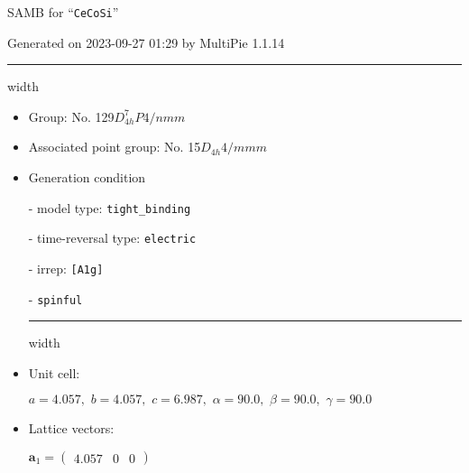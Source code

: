 \documentclass[fleqn,10pt,landscape]{article}
\begin{document}
\setcounter{MaxMatrixCols}{16}

\setlength{\baselineskip}{16pt}
\footnotesize
\begin{center}
\LARGE
SAMB for ``\texttt{CeCoSi}''
\end{center}
\begin{flushright}
Generated on 2023-09-27 01:29 by MultiPie 1.1.14
\end{flushright}
\vspace{1cm}


 \hfil \hrule height 1mm width \textwidth \hfil

\begin{itemize}
\item Group: No. 129\quad$D_{4h}^{7}$\quad$P4/nmm$\quad[ tetragonal ]

\item Associated point group: No. 15\quad$D_{4h}$\quad$4/mmm$\quad[ tetragonal ]

\vspace{5mm}

\item Generation condition

\quad - model type: \texttt{tight_binding}

\quad - time-reversal type: \texttt{electric}

\quad - irrep: \texttt{[A1g]}

\quad - \texttt{spinful}


 \hfil \hrule height 1mm width \textwidth \hfil

\item Unit cell:

\quad $a=4.057,\,\, b=4.057,\,\, c=6.987,\,\, \alpha=90.0,\,\, \beta=90.0,\,\, \gamma=90.0$

\item Lattice vectors:

\quad $\bm{a}_1=\begin{pmatrix} 4.057 & 0 & 0 \end{pmatrix}$


\end{itemize}
\end{document}
